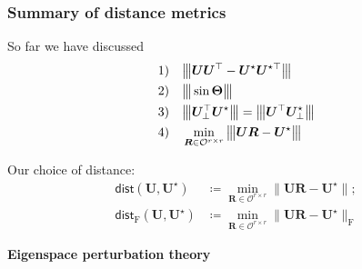 \documentclass[compress,
mathserif,wide,%
]{beamer}
\begin{document}
\begin{frame}
	\frametitle{Summary of distance metrics}
So far we have discussed
	\begin{align}
	\mathrm{1)} \quad & \vertiiibig{\bm{U}\bm{U}^{\top} - \bm{U}^{\star}\bm{U}^{\star\top}}  \notag\\
	\mathrm{2)} \quad & \vertiiibig{\sin\bm{\Theta}}  \notag\\
	\mathrm{3)} \quad & \vertiiibig{ \bm{U}_{\perp}^{\top}\bm{U}^{\star} }=\vertiiibig{ \bm{U}^{\top}\bm{U}^{\star}_{\perp} }  \notag \\
	\mathrm{4)} \quad & \min_{\bm{R}\in \mathcal{O}^{r\times r}} \vertiiibig{ \bm{U}\bm{R} - \bm{U}^{\star} } \notag
\end{align}

\pause
Our choice of distance: 
\begin{subequations}
\label{eq:dist_UUstar}
\begin{align*}
	\mathsf{dist}(\bm{U},\bm{U}^{\star}) &\coloneqq \min_{\bm{R}\in \mathcal{O}^{r\times r}} \big\| \bm{U}\bm{R} - \bm{U}^{\star} \big\|; \\
	\mathsf{dist}_{\mathrm{F}}(\bm{U},\bm{U}^{\star}) &\coloneqq  \min_{\bm{R}\in \mathcal{O}^{r\times r}} \big\| \bm{U}\bm{R} - \bm{U}^{\star} \big\|_{\mathrm{F}}
\end{align*}
\end{subequations}

\end{frame}



\begin{frame}[plain]

\vfill
\begin{center}
  {\Large\bf Eigenspace perturbation theory}
\end{center}
\vfill

\end{frame}
\end{document}

